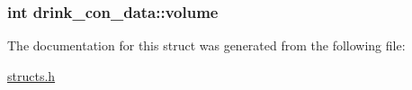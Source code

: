 \hypertarget{structdrink__con__data_a686fd202bd3b635278f013bbdc669f4a}{
\subsubsection[{volume}]{\setlength{\rightskip}{0pt plus 5cm}int drink\-\_\-con\-\_\-data\-::volume}}\label{structdrink__con__data_a686fd202bd3b635278f013bbdc669f4a}


The documentation for this struct was generated from the following file\-:\begin{DoxyCompactItemize}
\item 
\hyperlink{structs_8h}{structs.\-h}\end{DoxyCompactItemize}
